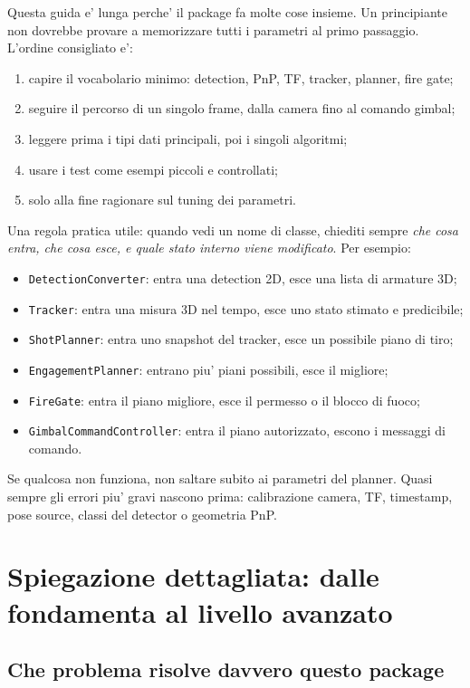 \documentclass[11pt,a4paper]{article}
\newcommand{\code}[1]{\texttt{#1}}
\begin{document}
Questa guida e' lunga perche' il package fa molte cose insieme. Un principiante non dovrebbe provare a memorizzare tutti i parametri al primo passaggio. L'ordine consigliato e':
\begin{enumerate}[leftmargin=1.4em]
  \item capire il vocabolario minimo: detection, PnP, TF, tracker, planner, fire gate;
  \item seguire il percorso di un singolo frame, dalla camera fino al comando gimbal;
  \item leggere prima i tipi dati principali, poi i singoli algoritmi;
  \item usare i test come esempi piccoli e controllati;
  \item solo alla fine ragionare sul tuning dei parametri.
\end{enumerate}

Una regola pratica utile: quando vedi un nome di classe, chiediti sempre \emph{che cosa entra, che cosa esce, e quale stato interno viene modificato}. Per esempio:
\begin{itemize}[leftmargin=1.4em]
  \item \code{DetectionConverter}: entra una detection 2D, esce una lista di armature 3D;
  \item \code{Tracker}: entra una misura 3D nel tempo, esce uno stato stimato e predicibile;
  \item \code{ShotPlanner}: entra uno snapshot del tracker, esce un possibile piano di tiro;
  \item \code{EngagementPlanner}: entrano piu' piani possibili, esce il migliore;
  \item \code{FireGate}: entra il piano migliore, esce il permesso o il blocco di fuoco;
  \item \code{GimbalCommandController}: entra il piano autorizzato, escono i messaggi di comando.
\end{itemize}

Se qualcosa non funziona, non saltare subito ai parametri del planner. Quasi sempre gli errori piu' gravi nascono prima: calibrazione camera, TF, timestamp, pose source, classi del detector o geometria PnP.

\section{Spiegazione dettagliata: dalle fondamenta al livello avanzato}

\subsection{Che problema risolve davvero questo package}
\end{document}
